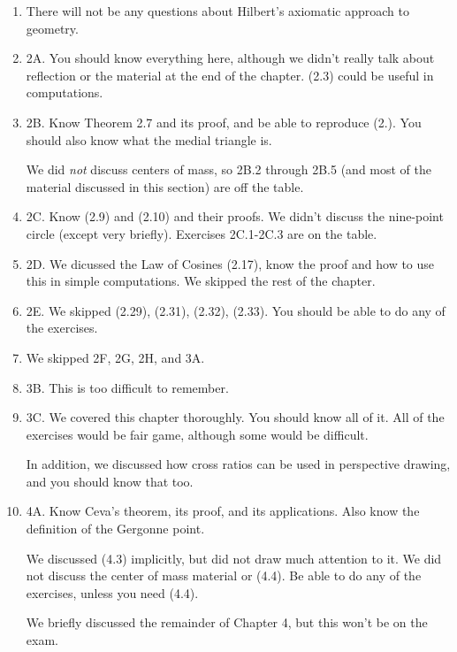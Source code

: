 \documentclass[12pt]{article}
\begin{document}
\begin{enumerate}[(1)]
\item There will not be any questions about Hilbert's axiomatic approach to geometry.

\item 2A. You should know everything here, although we didn't really talk about reflection or the material at the end
of the chapter. (2.3) could be useful in computations.
\item 2B. Know Theorem 2.7 and its proof, and be able to reproduce (2.). You should also know what the medial triangle is.

We did {\itshape not} discuss centers of mass, so 2B.2 through 2B.5 (and most of the material discussed in this section)
are off the table.

\item 2C. Know (2.9) and (2.10) and their proofs. We didn't discuss the nine-point circle (except very briefly).
Exercises 2C.1-2C.3 are on the table.

\item 2D. We dicussed the Law of Cosines (2.17), know the proof and how to use this in simple computations. We skipped
the rest of the chapter.

\item 2E. We skipped (2.29), (2.31), (2.32), (2.33). You should be able to do any of the exercises.

\item We skipped 2F, 2G, 2H, and 3A.

\item 3B. This is too difficult to remember.

\item 3C. We covered this chapter thoroughly. You should know all of it. All of the exercises would be fair game, although
some would be difficult.

In addition, we discussed how cross ratios can be used in perspective drawing, and you should know that too.

\item 4A. Know Ceva's theorem, its proof, and its applications. Also know the definition of the Gergonne point.

We discussed (4.3) implicitly, but did not draw much attention to it. We did not discuss the center of mass material or (4.4).
Be able to do any of the exercises, unless you need (4.4).

We briefly discussed the remainder of Chapter 4, but this won't be on the exam.
\end{enumerate}
\end{document}
